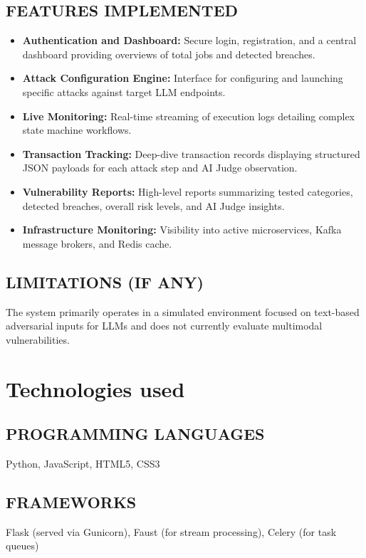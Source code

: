 \documentclass[12pt,a4paper]{article}
\begin{document}
\subsection*{FEATURES IMPLEMENTED}
\begin{itemize}
    \item \textbf{Authentication and Dashboard:} Secure login, registration, and a central dashboard providing overviews of total jobs and detected breaches.
    \item \textbf{Attack Configuration Engine:} Interface for configuring and launching specific attacks against target LLM endpoints.
    \item \textbf{Live Monitoring:} Real-time streaming of execution logs detailing complex state machine workflows.
    \item \textbf{Transaction Tracking:} Deep-dive transaction records displaying structured JSON payloads for each attack step and AI Judge observation.
    \item \textbf{Vulnerability Reports:} High-level reports summarizing tested categories, detected breaches, overall risk levels, and AI Judge insights.
    \item \textbf{Infrastructure Monitoring:} Visibility into active microservices, Kafka message brokers, and Redis cache.
\end{itemize}

\subsection*{LIMITATIONS (IF ANY)}
The system primarily operates in a simulated environment focused on text-based adversarial inputs for LLMs and does not currently evaluate multimodal vulnerabilities.

\section*{Technologies used}

\subsection*{PROGRAMMING LANGUAGES}
Python, JavaScript, HTML5, CSS3

\subsection*{FRAMEWORKS}
Flask (served via Gunicorn), Faust (for stream processing), Celery (for task queues)
\end{document}
